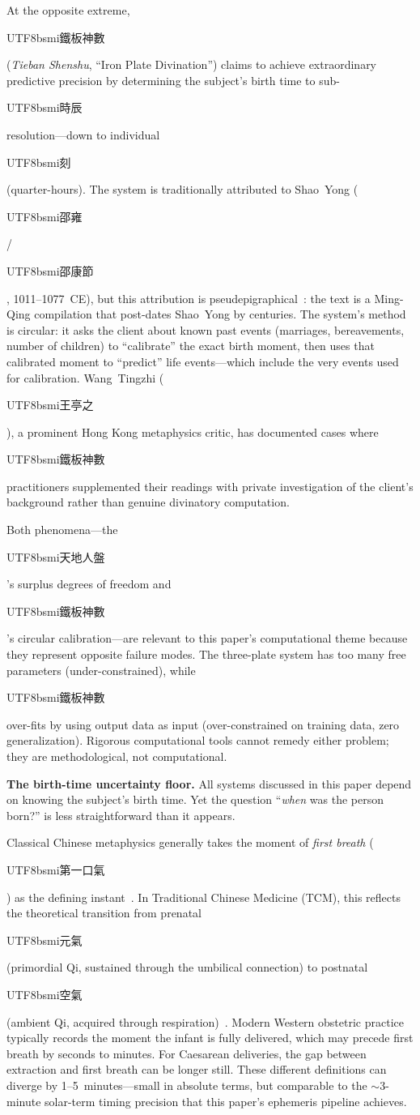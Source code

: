 \documentclass[10pt,a4paper]{article}
\newcommand{\zh}[1]{\begin{CJK}{UTF8}{bsmi}#1\end{CJK}}
\begin{document}
At the opposite extreme, \zh{鐵板神數} (\textit{Tieban Shenshu},
``Iron Plate Divination'') claims to achieve extraordinary predictive
precision by determining the subject's birth time to sub-\zh{時辰}
resolution---down to individual \zh{刻} (quarter-hours).  The system
is traditionally attributed to Shao~Yong (\zh{邵雍}/\zh{邵康節},
1011--1077~CE), but this attribution is
pseudepigraphical~\cite{lackner_zhao_2022}: the text is a Ming-Qing
compilation that post-dates Shao~Yong by centuries.  The system's
method is circular: it asks the client about known past events
(marriages, bereavements, number of children) to ``calibrate'' the
exact birth moment, then uses that calibrated moment to ``predict'' life
events---which include the very events used for calibration.
Wang~Tingzhi (\zh{王亭之}), a prominent Hong Kong metaphysics critic,
has documented cases where \zh{鐵板神數} practitioners supplemented
their readings with private investigation of the client's background
rather than genuine divinatory computation.

Both phenomena---the \zh{天地人盤}'s surplus degrees of freedom and
\zh{鐵板神數}'s circular calibration---are relevant to this paper's
computational theme because they represent opposite failure modes.
The three-plate system has too many free parameters (under-constrained),
while \zh{鐵板神數} over-fits by using output data as input
(over-constrained on training data, zero generalization).  Rigorous
computational tools cannot remedy either problem; they are
methodological, not computational.

\textbf{The birth-time uncertainty floor.}
All systems discussed in this paper depend on knowing the subject's
birth time.  Yet the question ``\emph{when} was the person born?'' is
less straightforward than it appears.

Classical Chinese metaphysics generally takes the moment of
\emph{first breath} (\zh{第一口氣}) as the defining
instant~\cite{ho_peng_yoke_2003}.  In Traditional Chinese Medicine
(TCM), this reflects the theoretical transition from prenatal
\zh{元氣} (primordial Qi, sustained through the umbilical connection)
to postnatal \zh{空氣} (ambient Qi, acquired through
respiration)~\cite{huangdi_neijing}.  Modern Western obstetric practice
typically records the moment the infant is fully delivered, which may
precede first breath by seconds to minutes.  For Caesarean deliveries,
the gap between extraction and first breath can be longer still.
These different definitions can diverge by 1--5~minutes---small in
absolute terms, but comparable to the $\sim$3-minute solar-term timing
precision that this paper's ephemeris pipeline achieves.
\end{document}

